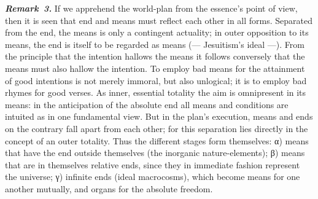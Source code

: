 \documentclass[12pt]{book}
\newcommand{\anm}[1]{\emph{\textbf{Remark~#1.}}}
\begin{document}
\anm{3} If we apprehend the world-plan from the essence's point of view,
then it is seen that end and means must reflect each other in all forms.
Separated from the end, the means is only a contingent actuality; in outer
opposition to its means, the end is itself to be regarded as means (---
Jesuitism's ideal ---). From the principle that the intention hallows the
means it follows conversely that the means must also hallow the intention.
To employ bad means for the attainment of good intentions is not merely
immoral, but also unlogical; it is to employ bad rhymes for good verses. As
inner, essential totality the aim is omnipresent in its means: in the
anticipation of the absolute end all means and conditions are intuited as in
one fundamental view. But in the plan's execution, means and ends on the
contrary fall apart from each other; for this separation lies directly in
the concept of an outer totality. Thus the different stages form themselves:
α) means that have the end outside themselves (the inorganic
nature-elements); β) means that are in themselves relative ends, since they
in immediate fashion represent the universe; γ) infinite ends (ideal
macrocosms), which become means for one another mutually, and organs for the
absolute freedom.
\end{document}
